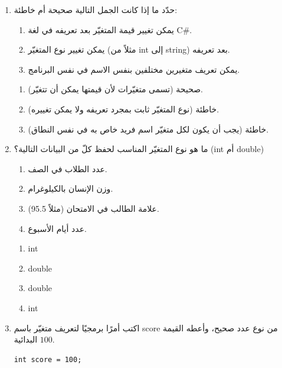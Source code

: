 \documentclass[14pt]{extarticle}
\begin{document}
\begin{enumerate}[resume, itemsep=2em]

\item
حدّد ما إذا كانت الجمل التالية صحيحة أم خاطئة:
\begin{enumerate}
    \item يمكن تغيير قيمة المتغيّر بعد تعريفه في لغة \textenglish{C\#}.
    \item يمكن تغيير نوع المتغيّر (مثلاً من \textenglish{int} إلى \textenglish{string}) بعد تعريفه.
    \item يمكن تعريف متغيرين مختلفين بنفس الاسم في نفس البرنامج.
\end{enumerate}
\ifwithsols
\begin{boxSolution}
\begin{enumerate}
    \item صحيحة (تسمى متغيّرات لأن قيمتها يمكن أن تتغيّر).
    \item خاطئة (نوع المتغيّر ثابت بمجرد تعريفه ولا يمكن تغييره).
    \item خاطئة (يجب أن يكون لكل متغيّر اسم فريد خاص به في نفس النطاق).
\end{enumerate}
\end{boxSolution}
\fi

\item
ما هو نوع المتغيّر المناسب لحفظ كلّ من البيانات التالية؟ (\textenglish{int} أم \textenglish{double})
\begin{enumerate}
    \item عدد الطلاب في الصف.
    \item وزن الإنسان بالكيلوغرام.
    \item علامة الطالب في الامتحان (مثلاً 95.5).
    \item عدد أيام الأسبوع.
\end{enumerate}
\ifwithsols
\begin{boxSolution}
\begin{enumerate}
    \item \textenglish{int}
    \item \textenglish{double}
    \item \textenglish{double}
    \item \textenglish{int}
\end{enumerate}
\end{boxSolution}
\fi

\item
اكتب أمرًا برمجيًا لتعريف متغيّر باسم \textenglish{score} من نوع عدد صحيح، وأعطه القيمة البدائية $100$.
\ifwithsols
\begin{boxSolution}
\begin{english}
\begin{verbatim}
int score = 100;
\end{verbatim}
\end{english}
\end{boxSolution}
\fi


\end{enumerate}
\end{document}
